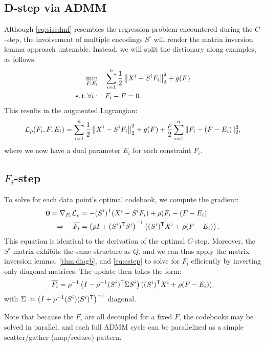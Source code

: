\documentclass{article}
\begin{document}
\subsection{D-step via ADMM}
Although \autoref{eq:siscdmf} resembles the regression problem encountered during the $C$-step, the involvement of multiple encodings $S^i$ will render the matrix inversion lemma approach
untenable.  Instead, we will split the dictionary along examples, as follows:
\begin{align}
\min_{F, F_i} \quad& \sum_{i=1}^n \frac{1}{2} \left\|X^i - S^i F_i\right\|_2^2 + g(F)\\
\operatorname{s.t.} \forall i: \quad & F_i - F = 0 \notag.
\end{align}
This results in the augmented Lagrangian:
\[
\mathcal{L}_\rho(F_i, F, E_i) = \sum_{i=1}^n \frac{1}{2} \left\|X^i - S^i F_i\right\|_2^2 + g(F) + \frac{\rho}{2}\sum_{i=1}^n \|F_i - (F - E_i)\|_2^2,
\]
where we now have a dual parameter $E_i$ for each constraint $F_i$.

\subsection{$F_i$-step}
To solve for each data point's optimal codebook, we compute the gradient:
\begin{align*}
\mathbf{0} = \nabla_{F_i}\mathcal{L}_\rho &= -(S^i)^\mathsf{T} (X^i - S^i F_i) + \rho(F_i - (F - E_i)\\
\Rightarrow\quad \overline{F_i} &= \left(\rho I + (S^i)^\mathsf{T} S^i \right)^{-1} \left((S^i)^\mathsf{T} X^i + \rho (F - E_i) \right).
\end{align*}
This equation is identical to the derivation of the optimal $C$-step.  Moreover, the $S^i$ matrix exhibits the same structure as $Q$, and we can thus apply the matrix inversion lemma, 
\autoref{thm:diagb}, and \autoref{eq:cstep} to solve for $F_i$ efficiently by inverting only diagonal matrices.  The update then takes the form:
\begin{align}
\overline{F_i} = \rho^{-1}\left( I - \rho^{-1} (S^i)^\mathsf{T} \Sigma S^i\right) ((S^i)^\mathsf{T} X^i + \rho(F-E_i)).\label{eq:fistep}
\end{align}
with $\Sigma \defeq \left(I + \rho^{-1} (S^i) (S^i)\trans\right)^{-1}$ diagonal.

Note that because the $F_i$ are all decoupled for a fixed $F$, the codebooks may be solved in parallel, and each full ADMM cycle can be parallelized as a simple scatter/gather (map/reduce)
pattern.
\end{document}
